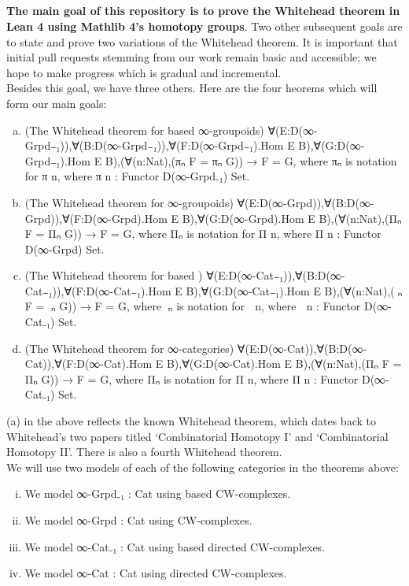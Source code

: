 \documentclass{book}
\theoremstyle{definition}
\newcounter{pcounter}
\newcounter{sectioncount}
\newcounter{subsectioncount}
\renewcommand{\section}[1]{\newpage\ \\ \ \\ \begin{center} \scalebox{1.5}{\texttt{\thesectioncount . #1}} \stepcounter{sectioncount} \setcounter{subsectioncount}{1} \end{center} \begin{center} \ \\ \ \\ \thispagestyle{empty} \end{center}}
\begin{document}
\newpage
\section{Introduction}

{\bf The main goal of this repository is to prove the Whitehead theorem in Lean 4 using Mathlib 4's homotopy groups}. Two other subsequent goals are to state and prove two variations of the Whitehead theorem. It is important that initial pull requests stemming from our work remain basic and accessible; we hope to make progress which is gradual and incremental.\\

Besides this goal, we have three others. Here are the four heorems which will form our main goals:

\begin{enumerate}[(a)]
\item (The Whitehead theorem for based ∞-groupoids) ∀(E:D(∞-Grpd₋₁)),∀(B:D(∞-Grpd₋₁)),∀(F:D(∞-Grpd₋₁).Hom E B),∀(G:D(∞-Grpd₋₁).Hom E B),(∀(n:Nat),(πₙ F = πₙ G)) → F = G, where πₙ is notation for π n, where π n : Functor D(∞-Grpd₋₁) Set.
\item (The Whitehead theorem for ∞-groupoids) ∀(E:D(∞-Grpd)),∀(B:D(∞-Grpd)),∀(F:D(∞-Grpd).Hom E B),∀(G:D(∞-Grpd).Hom E B),(∀(n:Nat),(Πₙ F = Πₙ G)) → F = G, where Πₙ is notation for Π n, where Π n : Functor D(∞-Grpd) Set.
\item (The Whitehead theorem for based ) ∀(E:D(∞-Cat₋₁)),∀(B:D(∞-Cat₋₁)),∀(F:D(∞-Cat₋₁).Hom E B),∀(G:D(∞-Cat₋₁).Hom E B),(∀(n:Nat),(π⃗ₙ F = π⃗ₙ G)) → F = G, where π⃗ₙ is notation for π⃗ n, where π⃗ n : Functor D(∞-Cat₋₁) Set.
\item (The Whitehead theorem for ∞-categories) ∀(E:D(∞-Cat)),∀(B:D(∞-Cat)),∀(F:D(∞-Cat).Hom E B),∀(G:D(∞-Cat).Hom E B),(∀(n:Nat),(Π⃗ₙ F = Π⃗ₙ G)) → F = G, where Π⃗ₙ is notation for Π⃗ n, where Π⃗ n : Functor D(∞-Cat₋₁) Set.
\end{enumerate}

(a) in the above reflects the known Whitehead theorem, which dates back to Whitehead's two papers titled `Combinatorial Homotopy I' and `Combinatorial Homotopy II'. There is also a fourth Whitehead theorem.\\

We will use two models of each of the following categories in the theorems above:

\begin{enumerate}[(i)]
\item We model ∞-Grpd₋₁ : Cat using based CW-complexes.
\item We model ∞-Grpd : Cat using CW-complexes.
\item We model ∞-Cat₋₁ : Cat using based directed CW-complexes.
\item We model ∞-Cat : Cat using directed CW-complexes.
\end{enumerate}
\end{document}
